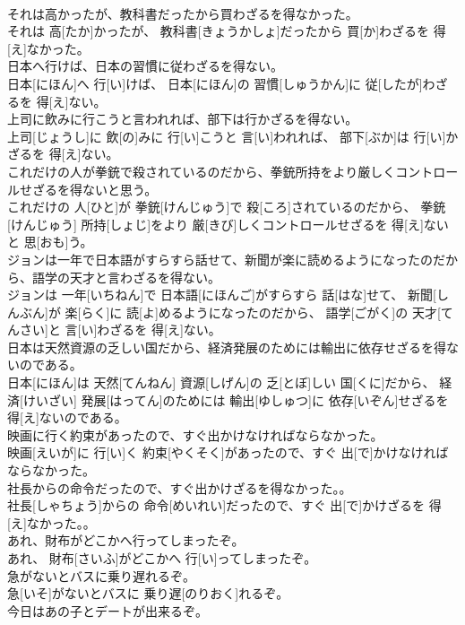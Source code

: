 \documentclass[8pt]{extreport}
\begin{document}
\begin{CJK}{UTF8}{min}
\\	それは高かったが、教科書だったから買わざるを得なかった。	
\\	それは 高[たか]かったが、 教科書[きょうかしょ]だったから 買[か]わざるを 得[え]なかった。
\\	日本へ行けば、日本の習慣に従わざるを得ない。	
\\	日本[にほん]へ 行[い]けば、 日本[にほん]の 習慣[しゅうかん]に 従[したが]わざるを 得[え]ない。
\\	上司に飲みに行こうと言われれば、部下は行かざるを得ない。	
\\	上司[じょうし]に 飲[の]みに 行[い]こうと 言[い]われれば、 部下[ぶか]は 行[い]かざるを 得[え]ない。
\\	これだけの人が拳銃で殺されているのだから、拳銃所持をより厳しくコントロールせざるを得ないと思う。	
\\	これだけの 人[ひと]が 拳銃[けんじゅう]で 殺[ころ]されているのだから、 拳銃[けんじゅう] 所持[しょじ]をより 厳[きび]しくコントロールせざるを 得[え]ないと 思[おも]う。
\\	ジョンは一年で日本語がすらすら話せて、新聞が楽に読めるようになったのだから、語学の天才と言わざるを得ない。	
\\	ジョンは 一年[いちねん]で 日本語[にほんご]がすらすら 話[はな]せて、 新聞[しんぶん]が 楽[らく]に 読[よ]めるようになったのだから、 語学[ごがく]の 天才[てんさい]と 言[い]わざるを 得[え]ない。
\\	日本は天然資源の乏しい国だから、経済発展のためには輸出に依存せざるを得ないのである。	
\\	日本[にほん]は 天然[てんねん] 資源[しげん]の 乏[とぼ]しい 国[くに]だから、 経済[けいざい] 発展[はってん]のためには 輸出[ゆしゅつ]に 依存[いぞん]せざるを 得[え]ないのである。
\\	映画に行く約束があったので、すぐ出かけなければならなかった。	
\\	映画[えいが]に 行[い]く 約束[やくそく]があったので、すぐ 出[で]かけなければならなかった。
\\	社長からの命令だったので、すぐ出かけざるを得なかった。。	
\\	社長[しゃちょう]からの 命令[めいれい]だったので、すぐ 出[で]かけざるを 得[え]なかった。。
\\	あれ、財布がどこかへ行ってしまったぞ。	
\\	あれ、 財布[さいふ]がどこかへ 行[い]ってしまったぞ。
\\	急がないとバスに乗り遅れるぞ。	
\\	急[いそ]がないとバスに 乗り遅[のりおく]れるぞ。
\\	今日はあの子とデートが出来るぞ。	

\end{CJK}
\end{document}
